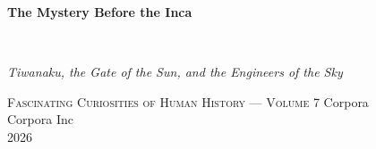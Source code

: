 \clearpage
\vspace*{1.5in}
\begin{center}
  \begin{minipage}{\textwidth}
    \centering
    \Huge\bfseries
    \linespread{1.25}\selectfont
    The Mystery Before the Inca
  \end{minipage}
  \\[3em]
  {\Large\itshape\linespread{1.3}\selectfont
  Tiwanaku, the Gate of the Sun, and the Engineers of the Sky\par}
  \vspace{2em}
  {\small\scshape Fascinating Curiosities of Human History — Volume 7}
  \vfill
  {\large Corpora}
  \\[1em]
  {\large Corpora Inc}
  \\[1em]
  {\large 2026}
\end{center}
\clearpage
